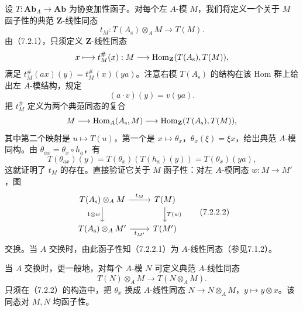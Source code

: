 设 $T:\mathbf{Ab}_A\to\mathbf{Ab}$ 为协变加性函子。对每个左 $A$-模 $M$，我们将定义一个关于 $M$ 函子性的典范 $\mathbf Z$-线性同态
\begin{equation}
 t_M:T(A_{\mathrm s})\otimes_A M\longrightarrow T(M).
 \tag{7.2.2.1}
\end{equation}
由（7.2.1），只须定义 $\mathbf Z$-线性同态
\[
 x\longmapsto t_M^\#(x):M\longrightarrow
 \operatorname{Hom}_{\mathbf Z}(T(A_{\mathrm s}),T(M)),
\]
满足 $t_M^\#(ax)(y)=t_M^\#(x)(ya)$。注意右模 $T(A_{\mathrm s})$ 的结构在该 Hom 群上给出左 $A$-模结构，规定
\[
 (a\cdot v)(y)=v(ya).
\]
把 $t_M^\#$ 定义为两个典范同态的复合
\[
 M\longrightarrow\operatorname{Hom}_A(A_{\mathrm s},M)
 \longrightarrow\operatorname{Hom}_{\mathbf Z}(T(A_{\mathrm s}),T(M)),
\]
其中第二个映射是 $u\mapsto T(u)$，第一个是 $x\mapsto\theta_x$，$\theta_x(\xi)=\xi x$，给出典范 $A$-模同构。由 $\theta_{ax}=\theta_x\circ h_a$，有
\[
 T(\theta_{ax})(y)=T(\theta_x)(T(h_a)(y))=T(\theta_x)(ya),
\]
这就证明了 $t_M$ 的存在。直接验证它关于 $M$ 函子性：对左 $A$-模同态 $w:M\to M'$，图
\begin{equation}
 \begin{tikzcd}
 T(A_{\mathrm s})\otimes_A M\arrow[r,"t_M"]\arrow[d,"1\otimes w"']&T(M)\arrow[d,"T(w)"]\\
 T(A_{\mathrm s})\otimes_A M'\arrow[r,"t_{M'}"']&T(M')
 \end{tikzcd}\tag{7.2.2.2}
\end{equation}
交换。当 $A$ 交换时，由此函子性知（7.2.2.1）为 $A$-线性同态（参见7.1.2）。

当 $A$ 交换时，更一般地，对每个 $A$-模 $N$ 可定义典范 $A$-线性同态
\begin{equation}
 T(N)\otimes_A M\longrightarrow T(N\otimes_A M).
 \tag{7.2.3.1}
\end{equation}
只须在（7.2.2）的构造中，把 $\theta_x$ 换成 $A$-线性同态 $N\to N\otimes_A M$，$y\mapsto y\otimes x$。该同态对 $M,N$ 均函子性。

